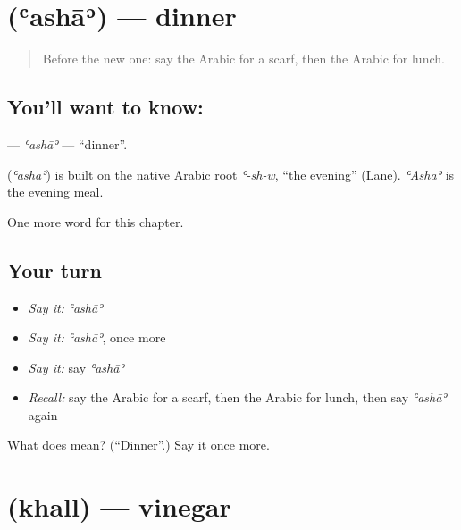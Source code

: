 \section[\texorpdfstring{\ar{عشاء} (ʿashāʾ)}{عشاء (ʿashāʾ)}]{ (ʿashāʾ) — dinner}

\label{lesson:AR-C119-asha}



\begin{quote}
Before the new one: say the Arabic for a scarf, then the Arabic for lunch.
\end{quote}

\subsection*{You'll want to know: }
\textbf{} — \emph{ʿashāʾ} — \textquotedblleft{}dinner\textquotedblright{}.

\begin{cousinweb}
\textbf{} (\emph{ʿashāʾ}) is built on the native Arabic root \emph{ʿ-sh-w}, \textquotedblleft{}the evening\textquotedblright{} (Lane). \emph{ʿAshāʾ} is the evening meal.
\end{cousinweb}

\begin{grammarlens}[title={What you've built}]
One more word for this chapter.
\end{grammarlens}

\subsection*{Your turn}
\begin{itemize}
\raggedright
  \item \emph{Say it:} \emph{ʿashāʾ}
  \item \emph{Say it:} \emph{ʿashāʾ}, once more
  \item \emph{Say it:} say \emph{ʿashāʾ}
  \item \emph{Recall:} say the Arabic for a scarf, then the Arabic for lunch, then say \emph{ʿashāʾ} again
\end{itemize}

\begin{tcolorbox}[breakable,colback=teal!4,colframe=teal!35!black,title={Before you move on}]
What does  mean? (\textquotedblleft{}Dinner\textquotedblright{}.) Say it once more.
\end{tcolorbox}
\section[\texorpdfstring{\ar{خل} (khall)}{خل (khall)}]{ (khall) — vinegar}

